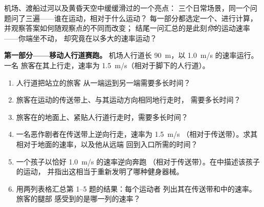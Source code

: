 \begin{problem}
\label{pb:g10:relative-motion:1}
机场、渡船过河以及黄昏天空中缓缓滑过的一个亮点：
三个日常场景，同一个问题问了三遍——谁在运动，相对于什么运动？
每一部分都选定一个、进行计算，并观察答案如何随观察点的不同而改变；
结尾一问汇总的是此刻\emph{你}的运动速率——你端坐不动，
却究竟在以多大的速率运动？

\medskip
\noindent\textbf{第一部分——移动人行道赛跑。}
机场人行道长 \qty{90}{m}，以 \qty{1.0}{m/s} 的速率运行。一名
旅客在其上行走，速率为 \qty{1.5}{m/s}（相对于脚下的人行道）。
\begin{enumerate}
  \item 人行道把站立的旅客
        从一端运到另一端需要多长时间？
  \item 旅客在运动的传送带上、与其运动方向相同地行走时，
        需要多长时间？
  \item 旅客在的地面上、紧贴人行道行走时，需要多长时间？
  \item 一名恶作剧者在传送带上逆向行走，速率为 \qty{1.5}{m/s}
        （相对于传送带）。求其相对于地面的速率，以及他从远端
        回到入口所需的时间？
  \item 一个孩子以恰好 \qty{1.0}{m/s} 的速率逆向奔跑
        （相对于传送带）。在中描述该孩子的运动，
        并指出这相当于重新发明了哪种健身器械。
  \item 用两列表格汇总第 1--5 题的结果：每个运动者
        列出其在传送带和中的速率。旅客的腿部
        感受到的是哪一列的速率？
\end{enumerate}


\end{problem}
